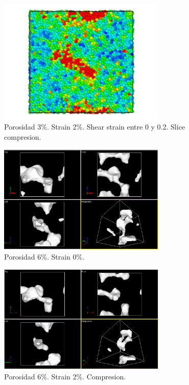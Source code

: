 \documentclass[10pt, oneside]{article} %
\begin{document}
\begin{figure}[H]
\centering
\includegraphics[width=8cm]{Figures/Porosidad/porosidad_3_muestra_2strain_color_slice_0_02.png}
\caption{Porosidad 3\%. Strain 2\%. Shear strain entre 0 y 0.2. Slice compresion.}
\end{figure}

\begin{figure}[H]
\centering
\includegraphics[width=8cm]{Figures/Porosidad/porosidad_6_muestra_0strain.png}
\caption{Porosidad 6\%. Strain 0\%.}
\end{figure}

\begin{figure}[H]
\centering
\includegraphics[width=8cm]{Figures/Porosidad/porosidad_6_muestra_2strain.png}
\caption{Porosidad 6\%. Strain 2\%. Compresion.}
\end{figure}
\end{document}
